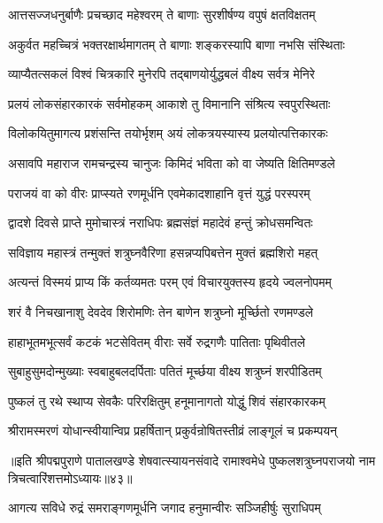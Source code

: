 \twolineshloka
{आत्तसज्जधनुर्बाणैः प्रचच्छाद महेश्वरम्}
{ते बाणाः सुरशीर्षण्य वपुषं क्षतविक्षतम्}%

\twolineshloka
{अकुर्वत महच्चित्रं भक्तरक्षार्थमागतम्}
{ते बाणाः शङ्करस्यापि बाणा नभसि संस्थिताः}%

\twolineshloka
{व्याप्यैतत्सकलं विश्वं चित्रकारि मुनेरपि}
{तद्बाणयोर्युद्धबलं वीक्ष्य सर्वत्र मेनिरे}%

\twolineshloka
{प्रलयं लोकसंहारकारकं सर्वमोहकम्}
{आकाशे तु विमानानि संश्रित्य स्वपुरस्थिताः}%

\twolineshloka
{विलोकयितुमागत्य प्रशंसन्ति तयोर्भृशम्}
{अयं लोकत्रयस्यास्य प्रलयोत्पत्तिकारकः}%

\twolineshloka
{असावपि महाराज रामचन्द्रस्य चानुजः}
{किमिदं भविता को वा जेष्यति क्षितिमण्डले}%

\twolineshloka
{पराजयं वा को वीरः प्राप्स्यते रणमूर्धनि}
{एवमेकादशाहानि वृत्तं युद्धं परस्परम्}%

\twolineshloka
{द्वादशे दिवसे प्राप्ते मुमोचास्त्रं नराधिपः}
{ब्रह्मसंज्ञं महादेवं हन्तुं क्रोधसमन्वितः}%

\twolineshloka
{सविज्ञाय महास्त्रं तन्मुक्तं शत्रुघ्नवैरिणा}
{हसन्नप्यपिबत्तेन मुक्तं ब्रह्मशिरो महत्}%

\twolineshloka
{अत्यन्तं विस्मयं प्राप्य किं कर्तव्यमतः परम्}
{एवं विचारयुक्तस्य हृदये ज्वलनोपमम्}%

\twolineshloka
{शरं वै निचखानाशु देवदेव शिरोमणिः}
{तेन बाणेन शत्रुघ्नो मूर्च्छितो रणमण्डले}%

\twolineshloka
{हाहाभूतमभूत्सर्वं कटकं भटसेवितम्}
{वीराः सर्वे रुद्रगणैः पातिताः पृथिवीतले}%

\twolineshloka
{सुबाहुसुमदोन्मुख्याः स्वबाहुबलदर्पिताः}
{पतितं मूर्च्छया वीक्ष्य शत्रुघ्नं शरपीडितम्}%

\twolineshloka
{पुष्कलं तु रथे स्थाप्य सेवकैः परिरक्षितुम्}
{हनूमानागतो योद्धुं शिवं संहारकारकम्}%

\twolineshloka
{श्रीरामस्मरणं योधान्स्वीयान्विप्र प्रहर्षितान्}
{प्रकुर्वन्रोषितस्तीव्रं लाङ्गूलं च प्रकम्पयन्}%

॥इति श्रीपद्मपुराणे पातालखण्डे शेषवात्स्यायनसंवादे रामाश्वमेधे पुष्कलशत्रुघ्नपराजयो नाम त्रिचत्वारिंशत्तमोऽध्यायः॥४३॥



\twolineshloka
{आगत्य सविधे रुद्रं समराङ्गणमूर्धनि}
{जगाद हनुमान्वीरः सञ्जिहीर्षुः सुराधिपम्}%


